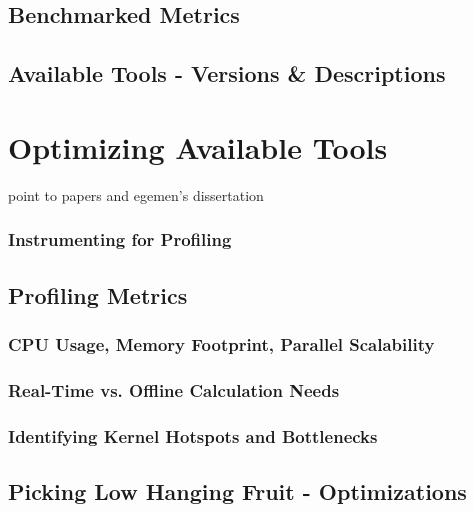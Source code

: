 

\section{Benchmarked Metrics}
\section{Available Tools - Versions \& Descriptions}

\chapter{Optimizing Available Tools}
point to papers and egemen's dissertation

 \subsection{Instrumenting for Profiling}
 \section{Profiling Metrics}
 \subsection{CPU Usage, Memory Footprint, Parallel Scalability}
 \subsection{Real-Time vs. Offline Calculation Needs}
 \subsection{Identifying Kernel Hotspots and Bottlenecks}
\section{Picking Low Hanging Fruit - Optimizations}